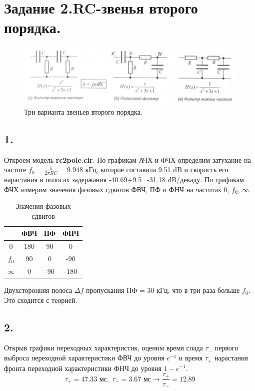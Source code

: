 \documentclass[a4paper, 12pt, twoside]{article}
\begin{document}
\section*{Задание 2.RC-звенья второго порядка.} 

\begin{figure}[H]
	\includegraphics[width =  0.9\linewidth]{RC}
	\caption{Три варианта звеньев второго порядка.}
	
\end{figure}
\subsection*{1.}


Откроем модель \textbf{rc2pole.cir}. По графикам АЧХ и ФЧХ определим затухание на частоте $f_0=\frac{1}{2\pi RC}=9.948$ кГц, которое составила 9.51 dB и скорость его нарастания в полосах задержания -40.69+9.5=-31.18 dB/декаду. По графикам ФЧХ измерим значения фазовых сдвигов ФВЧ, ПФ и ФНЧ на частотах 0, $f_0$, $\infty$. 

\begin{table}[H] 
	\centering 
	\caption{Значения фазовых сдвигов} 
	\label{table2.1} 
	\begin{tabular}{|c|c|c|c|} \hline
		& ФВЧ & ПФ & ФНЧ  \\ \hline
		0 & 180 & 90 & 0  \\  \hline
		$f_0$ & 90 & 0 & -90 \\ \hline
		$\infty$ & 0 & -90 & -180 \\ \hline
	\end{tabular} 
\end{table} 
Двухсторонняя полоса $\Delta f$ пропускания ПФ = 30 кГц, что в три раза больше $f_0$. Это сходится с теорией. 
\subsection*{2.} 
 
Открыв графики переходных характеристик, оценим время спада $\tau_{-}$ первого выброса переходной характеристики ФВЧ до уровня $e^{-1}$ и время $\tau_{+}$ нарастания фронта переходной характеристики ФНЧ до уровня $1-e^{-1}$. $$\tau_{+}=47.33\text{ мс},\;\tau_{-}=3.67\text{ мс}\rightarrow\frac{\tau_{+}}{\tau_{-}}=12.89$$
\end{document}
